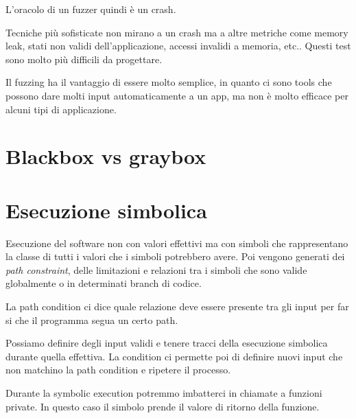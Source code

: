 \documentclass{article}
\begin{document}
L'oracolo di un fuzzer quindi è un crash.

Tecniche più sofisticate non mirano a un crash ma a altre metriche come memory leak, stati non validi dell'applicazione, accessi invalidi a memoria, etc.. Questi test sono molto più difficili da progettare.

Il fuzzing ha il vantaggio di essere molto semplice, in quanto ci sono tools che possono dare molti input automaticamente a un app, ma non è molto efficace per alcuni tipi di applicazione.

\section{Blackbox vs graybox}

\section{Esecuzione simbolica}
Esecuzione del software non con valori effettivi ma con simboli che rappresentano la classe di tutti i valori che i simboli potrebbero avere. Poi vengono generati dei \textit{path constraint}, delle limitazioni e relazioni tra i simboli che sono valide globalmente o in determinati branch di codice.

La path condition ci dice quale relazione deve essere presente tra gli input per far si che il programma segua un certo path.

Possiamo definire degli input validi e tenere tracci della esecuzione simbolica durante quella effettiva. La condition ci permette poi di definire nuovi input che non matchino la path condition e ripetere il processo.

Durante la symbolic execution potremmo imbatterci in chiamate a funzioni private. In questo caso il simbolo prende il valore di ritorno della funzione.
\end{document}
